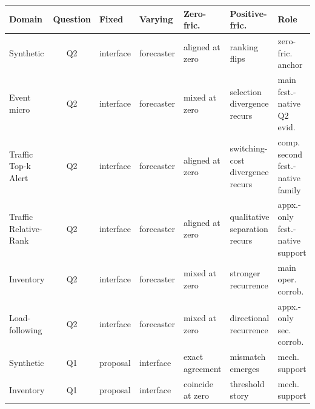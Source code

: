 \begin{tabularx}{\columnwidth}{@{}l c l l >{\raggedright\arraybackslash}X >{\raggedright\arraybackslash}X >{\raggedright\arraybackslash}X@{}}
\toprule
Domain & Question & Fixed & Varying & Zero-fric. & Positive-fric. & Role \\
\midrule
Synthetic & Q2 & interface & forecaster & aligned at zero & ranking flips & zero-fric. anchor \\
Event micro & Q2 & interface & forecaster & mixed at zero & selection divergence recurs & main fcst.-native Q2 evid. \\
Traffic Top-k Alert & Q2 & interface & forecaster & aligned at zero & switching-cost divergence recurs & comp. second fcst.-native family \\
Traffic Relative-Rank & Q2 & interface & forecaster & aligned at zero & qualitative separation recurs & appx.-only fcst.-native support \\
Inventory & Q2 & interface & forecaster & mixed at zero & stronger recurrence & main oper. corrob. \\
Load-following & Q2 & interface & forecaster & mixed at zero & directional recurrence & appx.-only sec. corrob. \\
Synthetic & Q1 & proposal & interface & exact agreement & mismatch emerges & mech. support \\
Inventory & Q1 & proposal & interface & coincide at zero & threshold story & mech. support \\
\bottomrule
\end{tabularx}
